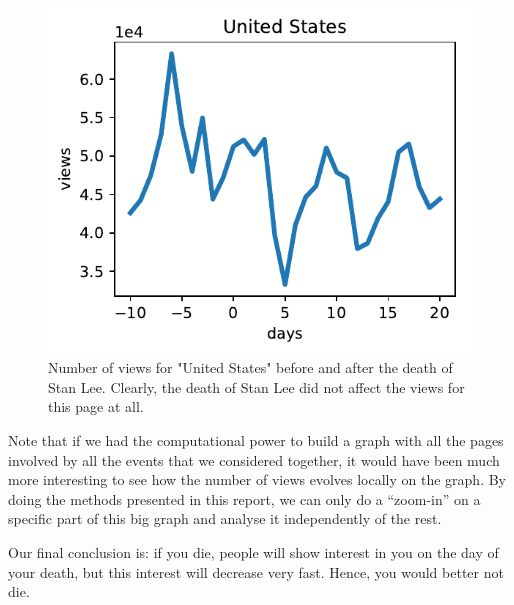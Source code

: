 \documentclass[conference]{IEEEtran}
\begin{document}
\begin{figure}[!htb]
\includegraphics[width=\linewidth]{UnitedStates.pdf}
\caption{Number of views for "United States" before and after the death of Stan Lee. Clearly, the death of Stan Lee did not affect the views for this page at all.} 
\end{figure}

Note that if we had the computational power to build a graph with all the pages involved by all the events that we considered together, it would have been much more interesting to see how the number of views evolves locally on the graph. By doing the methods presented in this report, we can only do a “zoom-in” on a specific part of this big graph and analyse it independently of the rest. 

\medskip

Our final conclusion is: if you die, people will show interest in you on the day of your death, but this interest will decrease very fast. Hence, you would better not die. 




\end{document}
